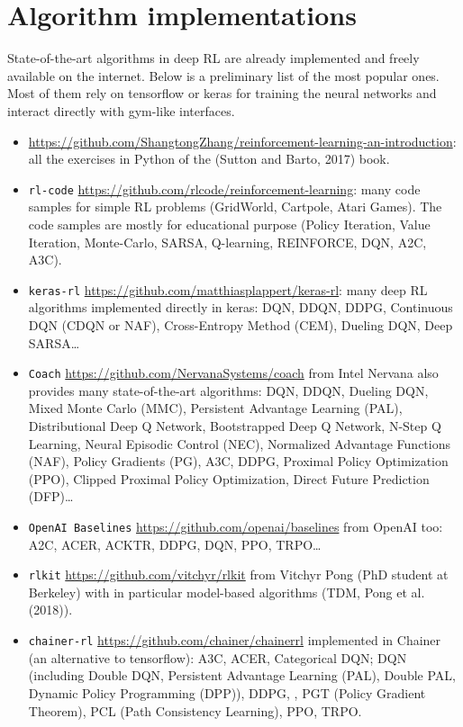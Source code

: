 \documentclass[
  letterpaper,
  DIV=11,
  numbers=noendperiod]{scrreprt}
\begin{document}
\hypertarget{algorithm-implementations}{%
\section{Algorithm implementations}\label{algorithm-implementations}}

State-of-the-art algorithms in deep RL are already implemented and
freely available on the internet. Below is a preliminary list of the
most popular ones. Most of them rely on tensorflow or keras for training
the neural networks and interact directly with gym-like interfaces.

\begin{itemize}
\item
  \url{https://github.com/ShangtongZhang/reinforcement-learning-an-introduction}:
  all the exercises in Python of the (Sutton and Barto, 2017) book.
\item
  \texttt{rl-code}
  \url{https://github.com/rlcode/reinforcement-learning}: many code
  samples for simple RL problems (GridWorld, Cartpole, Atari Games). The
  code samples are mostly for educational purpose (Policy Iteration,
  Value Iteration, Monte-Carlo, SARSA, Q-learning, REINFORCE, DQN, A2C,
  A3C).
\item
  \texttt{keras-rl} \url{https://github.com/matthiasplappert/keras-rl}:
  many deep RL algorithms implemented directly in keras: DQN, DDQN,
  DDPG, Continuous DQN (CDQN or NAF), Cross-Entropy Method (CEM),
  Dueling DQN, Deep SARSA\ldots{}
\item
  \texttt{Coach} \url{https://github.com/NervanaSystems/coach} from
  Intel Nervana also provides many state-of-the-art algorithms: DQN,
  DDQN, Dueling DQN, Mixed Monte Carlo (MMC), Persistent Advantage
  Learning (PAL), Distributional Deep Q Network, Bootstrapped Deep Q
  Network, N-Step Q Learning, Neural Episodic Control (NEC), Normalized
  Advantage Functions (NAF), Policy Gradients (PG), A3C, DDPG, Proximal
  Policy Optimization (PPO), Clipped Proximal Policy Optimization,
  Direct Future Prediction (DFP)\ldots{}
\item
  \texttt{OpenAI\ Baselines} \url{https://github.com/openai/baselines}
  from OpenAI too: A2C, ACER, ACKTR, DDPG, DQN, PPO, TRPO\ldots{}
\item
  \texttt{rlkit} \url{https://github.com/vitchyr/rlkit} from Vitchyr
  Pong (PhD student at Berkeley) with in particular model-based
  algorithms (TDM, Pong et al. (2018)).
\item
  \texttt{chainer-rl} \url{https://github.com/chainer/chainerrl}
  implemented in Chainer (an alternative to tensorflow): A3C, ACER,
  Categorical DQN; DQN (including Double DQN, Persistent Advantage
  Learning (PAL), Double PAL, Dynamic Policy Programming (DPP)), DDPG, ,
  PGT (Policy Gradient Theorem), PCL (Path Consistency Learning), PPO,
  TRPO.
\end{itemize}
\end{document}
